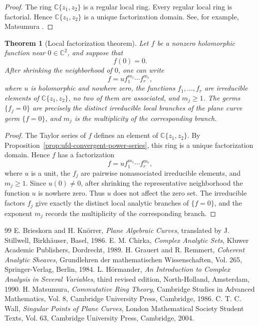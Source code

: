 \documentclass[10pt,a4paper]{amsart}
\newtheorem{theorem}{Theorem}
\newcommand{\C}{\mathbb C}
\begin{document}
\begin{proof}
The ring $\C\{z_1,z_2\}$ is a regular local ring. Every regular local
ring is factorial. Hence $\C\{z_1,z_2\}$ is a unique factorization
domain. See, for example, Matsumura \cite[Theorem~20.3]{Matsumura1986}.
\end{proof}


\begin{theorem}[Local factorization theorem]\label{th:local-factorization}
Let $f$ be a nonzero holomorphic function near $0\in\C^2$, and suppose
that
\[
        f(0)=0.
\]
After shrinking the neighborhood of $0$, one can write
\[
        f=u f_1^{m_1}\cdots f_r^{m_r},
\]
where $u$ is holomorphic and nowhere zero, the functions
$f_1,\ldots,f_r$ are irreducible elements of $\C\{z_1,z_2\}$, no two of
them are associated, and $m_j\ge1$. The germs $\{f_j=0\}$ are precisely
the distinct irreducible local branches of the plane curve germ
$\{f=0\}$, and $m_j$ is the multiplicity of the corresponding branch.
\end{theorem}

\begin{proof}
The Taylor series of $f$ defines an element of $\C\{z_1,z_2\}$. By
Proposition~\ref{prop:ufd-convergent-power-series}, this ring is a
unique factorization domain. Hence $f$ has a factorization
\[
        f=u f_1^{m_1}\cdots f_r^{m_r},
\]
where $u$ is a unit, the $f_j$ are pairwise nonassociated irreducible
elements, and $m_j\ge1$. Since $u(0)\ne0$, after shrinking the
representative neighborhood the function $u$ is nowhere zero. Thus $u$
does not affect the zero set. The irreducible factors $f_j$ give
exactly the distinct local analytic branches of $\{f=0\}$, and the
exponent $m_j$ records the multiplicity of the corresponding branch.
\end{proof}


\begin{thebibliography}{99}
 E. Brieskorn and H. Kn\"orrer, \newblock \emph{Plane Algebraic Curves}, \newblock translated by J. Stillwell, \newblock Birkh\"auser, Basel, 1986.
 E. M. Chirka, \newblock \emph{Complex Analytic Sets}, \newblock Kluwer Academic Publishers, Dordrecht, 1989.
 H. Grauert and R. Remmert, \newblock \emph{Coherent Analytic Sheaves}, \newblock Grundlehren der mathematischen Wissenschaften, Vol. 265, \newblock Springer-Verlag, Berlin, 1984.
 L. H\"ormander, \newblock \emph{An Introduction to Complex Analysis in Several Variables}, \newblock third revised edition, \newblock North-Holland, Amsterdam, 1990.
 H. Matsumura, \newblock \emph{Commutative Ring Theory}, \newblock Cambridge Studies in Advanced Mathematics, Vol. 8, \newblock Cambridge University Press, Cambridge, 1986.
 C. T. C. Wall, \newblock \emph{Singular Points of Plane Curves}, \newblock London Mathematical Society Student Texts, Vol. 63, \newblock Cambridge University Press, Cambridge, 2004.
\end{thebibliography}
\end{document}
